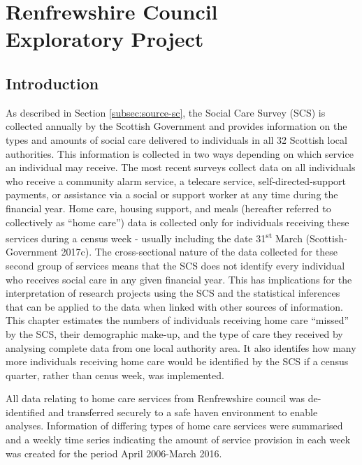 \documentclass[]{article}
\title{}
\author{}
\date{}
\begin{document}
\chapter[Renfrewshire Council Exploratory Project]{Renfrewshire Council \\ Exploratory Project}\label{ch:renfrew}

\thispagestyle{empty}

\section{Introduction}\label{renf-intro}

As described in Section \ref{subsec:source-sc}, the Social Care Survey
(SCS) is collected annually by the Scottish Government and provides
information on the types and amounts of social care delivered to
individuals in all 32 Scottish local authorities. This information is
collected in two ways depending on which service an individual may
receive. The most recent surveys collect data on all individuals who
receive a community alarm service, a telecare service,
self-directed-support payments, or assistance via a social or support
worker at any time during the financial year. Home care, housing
support, and meals (hereafter referred to collectively as ``home care'')
data is collected only for individuals receiving these services during a
census week - usually including the date 31\textsuperscript{st} March
(Scottish-Government 2017c). The cross-sectional nature of the data
collected for these second group of services means that the SCS does not
identify every individual who receives social care in any given
financial year. This has implications for the interpretation of research
projects using the SCS and the statistical inferences that can be
applied to the data when linked with other sources of information. This
chapter estimates the numbers of individuals receiving home care
``missed'' by the SCS, their demographic make-up, and the type of care
they received by analysing complete data from one local authority area.
It also identifes how many more individuals receiving home care would be
identified by the SCS if a census quarter, rather than cenus week, was
implemented.

All data relating to home care services from Renfrewshire council was
de-identified and transferred securely to a safe haven environment to
enable analyses. Information of differing types of home care services
were summarised and a weekly time series indicating the amount of
service provision in each week was created for the period April
2006-March 2016.
\end{document}
